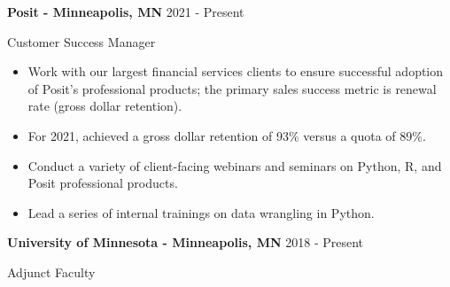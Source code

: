 \documentclass[11pt,a4paper,]{awesome-cv}
\begin{document}
\textbf{Posit - Minneapolis, MN} \hfill 2021 - Present

\vspace{-1ex}

Customer Success Manager

\vspace{-1.5ex}

\small

\begin{itemize}
\item
  Work with our largest financial services clients to ensure successful
  adoption of Posit's professional products; the primary sales success
  metric is renewal rate (gross dollar retention). \vspace{-0.5ex}
\item
  For 2021, achieved a gross dollar retention of 93\% versus a quota of
  89\%. \vspace{-0.5ex}
\item
  Conduct a variety of client-facing webinars and seminars on Python, R,
  and Posit professional products. \vspace{-0.5ex}
\item
  Lead a series of internal trainings on data wrangling in Python.
  \vspace{-0.5ex}
\end{itemize}

\normalsize

\textbf{University of Minnesota - Minneapolis, MN} \hfill 2018 - Present

\vspace{-1ex}

Adjunct Faculty

\vspace{-1.5ex}

\small
\end{document}
